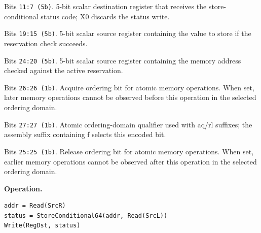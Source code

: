 \begin{description}[leftmargin=0.18\linewidth,style=nextline]
\item[\texttt{RegDst}] Bits \texttt{11:7 (5b)}. 5-bit scalar destination register that receives the store-conditional status code; X0 discards the status write.
\item[\texttt{SrcL}] Bits \texttt{19:15 (5b)}. 5-bit scalar source register containing the value to store if the reservation check succeeds.
\item[\texttt{SrcR}] Bits \texttt{24:20 (5b)}. 5-bit scalar source register containing the memory address checked against the active reservation.
\item[\texttt{aq}] Bits \texttt{26:26 (1b)}. Acquire ordering bit for atomic memory operations. When set, later memory operations cannot be observed before this operation in the selected ordering domain.
\item[\texttt{far}] Bits \texttt{27:27 (1b)}. Atomic ordering-domain qualifier used with aq/rl suffixes; the assembly suffix containing f selects this encoded bit.
\item[\texttt{rl}] Bits \texttt{25:25 (1b)}. Release ordering bit for atomic memory operations. When set, earlier memory operations cannot be observed after this operation in the selected ordering domain.
\end{description}
\noindent\textbf{Operation.}\par
\begin{lstlisting}[style=ptoscalarcode]
addr = Read(SrcR)
status = StoreConditional64(addr, Read(SrcL))
Write(RegDst, status)
\end{lstlisting}
\Needspace{0.08\textheight}
